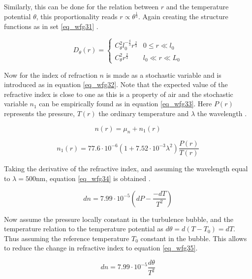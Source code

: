 \documentclass{article}
\begin{document}
Similarly, this can be done for the relation between $r$ and the temperature potential $\theta$, this proportionality reads $r \propto \theta^{\frac{1}{3}}$. Again creating the structure functions as in set \ref{eq_wfg31} \cite{zernikeMatlab}.

\begin{equation}
D_\theta(r) = 
\begin{cases}
C_\theta^2 l_0^{-\frac{4}{3}} r^{\frac{2}{3}} & 0 \leq r \ll l_0\\
C_\theta^2 r^{\frac{2}{3}} & l_0 \ll r \ll L_0 
\end{cases}
\label{eq_wfg31}
\end{equation}

Now for the index of refraction $n$ is made as a stochastic variable and is introduced as in equation \ref{eq_wfg32}. Note that the expected value of the refractive index is close to one as this is a property of air and the stochastic variable $n_1$ can be empirically found as in equation \ref{eq_wfg33}. Here $P(r)$ represents the pressure, $T(r)$ the ordinary temperature and $\lambda$ the wavelength \cite{zernikeMatlab}.

\begin{equation}
n(r) = \mu_n + n_1(r)
\label{eq_wfg32}
\end{equation}

\begin{equation}
n_1(r) = 77.6 \cdot 10^{-6} (1 + 7.52 \cdot 10^{-3} \lambda^2) \frac{P(r)}{T(r)}
\label{eq_wfg33}
\end{equation}

Taking the derivative of the refractive index, and assuming the wavelength equal to $\lambda  = 500 \text{nm}$, equation \ref{eq_wfg34} is obtained \cite{zernikeMatlab}.

\begin{equation}
dn = 7.99 \cdot 10^{-5} \left( dP - \frac{-dT}{T^2} \right)
\label{eq_wfg34}
\end{equation}

Now assume the pressure locally constant in the turbulence bubble, and the temperature relation to the temperature potential as $d\theta = d(T - T_0) = dT$. Thus assuming the reference temperature $T_0$ constant in the bubble.  This allows to reduce the change in refractive index to equation \ref{eq_wfg35}.

\begin{equation}
dn = 7.99 \cdot 10^{-5} \frac{d\theta}{T^2}
\label{eq_wfg35}
\end{equation}
\end{document}
